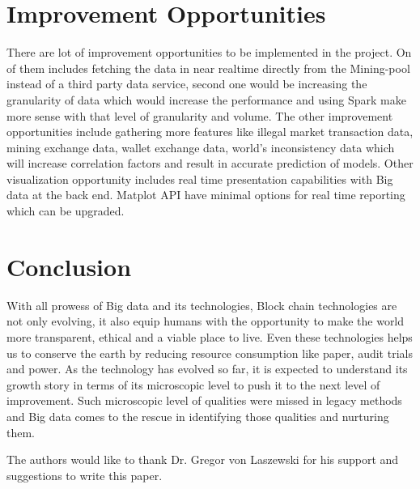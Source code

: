 \documentclass[sigconf]{acmart}
\begin{document}
\section{Improvement Opportunities}
There are lot of improvement opportunities to be implemented in the project. On of them includes fetching the data in near realtime directly from the Mining-pool instead of a third party data service, second one would be increasing the granularity of data which would increase the performance and using Spark make more sense with that level of granularity and volume. The other improvement opportunities include gathering more features like illegal market transaction data, mining exchange data, wallet exchange data, world's inconsistency data which will increase correlation factors and result in accurate prediction of models. Other visualization  opportunity includes real time presentation capabilities with Big data at the back end. Matplot API have minimal options for real time reporting which can be upgraded.

\section{Conclusion}

With all prowess of Big data and its technologies, Block chain technologies are not only evolving, it also equip humans with the opportunity to make the world more transparent, ethical and a viable place to live. Even these technologies helps us to conserve the earth by reducing resource consumption like paper, audit trials and power. As the technology has evolved so far, it is expected to understand its growth story in terms of its microscopic level to push it to the next level of improvement. Such microscopic level of qualities were missed in legacy methods and Big data comes to the rescue in identifying those qualities and nurturing them.


\begin{acks}
  The authors would like to thank Dr. Gregor von Laszewski for his
  support and suggestions to write this paper.
\end{acks}


 


\end{document}
